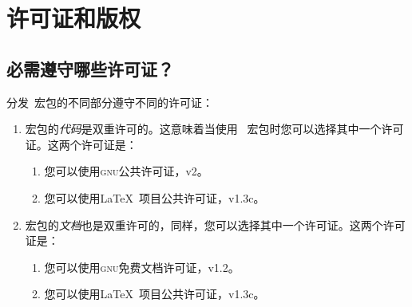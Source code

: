%
%
%


\section{许可证和版权}
\label{section-license}

\subsection{必需遵守哪些许可证？}


分发\pgfname\ 宏包的不同部分遵守不同的许可证：

%
\begin{enumerate}
    \item 宏包的\emph{代码}是双重许可的。这意味着当使用 \pgfname\ 宏包时您可以选择其中一个许可证。这两个许可证是：
        \begin{enumerate}
            \item 您可以使用\textsc{gnu}公共许可证，v2。
            \item 您可以使用\LaTeX\ 项目公共许可证，v1.3c。
        \end{enumerate}
    \item 宏包的\emph{文档}也是双重许可的，同样，您可以选择其中一个许可证。这两个许可证是：
        \begin{enumerate}
            \item 您可以使用\textsc{gnu}免费文档许可证，v1.2。
            \item 您可以使用\LaTeX\ 项目公共许可证，v1.3c。
        \end{enumerate}
\end{enumerate}

